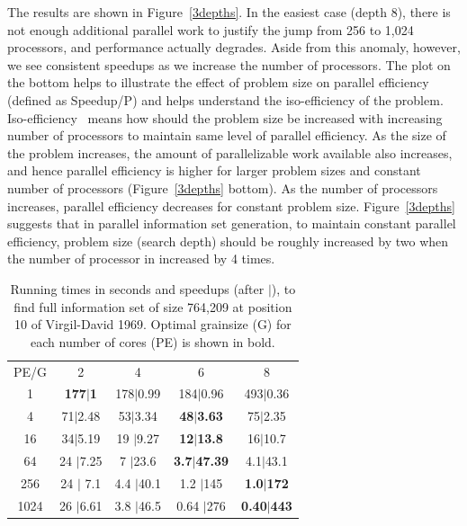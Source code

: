 \documentclass[10pt, conference, compsocconf]{IEEEtran}
\begin{document}
The results are shown in Figure~\ref{3depths}.  In the easiest case (depth 8),
there is not enough additional parallel work to justify the jump from 256 to
1,024 processors, and performance actually degrades.  Aside from this anomaly,
however, we see consistent speedups as we increase the number of processors. 
The plot on the bottom helps to illustrate the effect of problem size on parallel efficiency (defined as Speedup/P) and helps understand the iso-efficiency of the problem. Iso-efficiency~\cite{b:grama-isoefficiency} means how should the problem size be increased with increasing number of processors to maintain same level of parallel efficiency. As the size of the problem increases, the amount of parallelizable work available also increases, and hence parallel efficiency is higher for larger problem sizes and constant number of processors (Figure~\ref{3depths} bottom). As the number of processors increases, parallel efficiency decreases for constant problem size. Figure~\ref{3depths} suggests that in parallel information set generation, to maintain constant parallel efficiency, problem size (search depth) should be roughly increased by two when the number of processor in increased by 4 times.

\begin{table}[ht]
\caption{Running times in seconds and speedups (after $|$), to find full
information set of size 764,209 at position 10 of Virgil-David 1969. Optimal
grainsize (G) for each number of cores (PE) is shown in bold.}


\centering
\begin{tabular}{ccccc}
PE/G & 2 & 4 & 6 & 8 \\
1 & {\bf 177$|$1} & 178$|$0.99 & 184$|$0.96 & 493$|$0.36 \\
4 & 71$|$2.48 & 53$|$3.34 & {\bf 48$|$3.63} & 75$|$2.35 \\
16 & 34$|$5.19 & 19 $|$9.27& {\bf 12$|$13.8} & 16$|$10.7 \\
64 & 24 $|$7.25 & 7 $|$23.6& {\bf 3.7$|$47.39} & 4.1$|$43.1 \\
256 & 24 $|$ 7.1& 4.4 $|$40.1 & 1.2 $|$145& {\bf 1.0$|$172} \\
1024 & 26 $|$6.61 & 3.8 $|$46.5& 0.64 $|$276& {\bf 0.40$|$443}
\end{tabular}

\label{tab:prob4}
\vspace{-0.1in}
\end{table}
\end{document}
